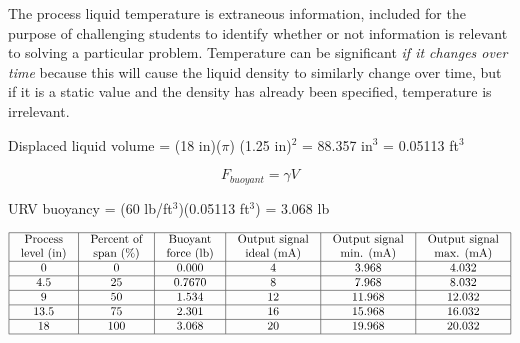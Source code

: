 
The process liquid temperature is extraneous information, included for the purpose of challenging students to identify whether or not information is relevant to solving a particular problem.  Temperature can be significant {\it if it changes over time} because this will cause the liquid density to similarly change over time, but if it is a static value and the density has already been specified, temperature is irrelevant.

\vskip 10pt

Displaced liquid volume = (18 in)($\pi$) (1.25 in)$^{2}$ = 88.357 in$^{3}$ = 0.05113 ft$^{3}$

$$F_{buoyant} = \gamma V$$

URV buoyancy = (60 lb/ft$^{3}$)(0.05113 ft$^{3}$) = 3.068 lb

\vskip 10pt


$$\vbox{\offinterlineskip
\halign{\strut
\vrule \quad\hfil # \ \hfil & 
\vrule \quad\hfil # \ \hfil & 
\vrule \quad\hfil # \ \hfil & 
\vrule \quad\hfil # \ \hfil & 
\vrule \quad\hfil # \ \hfil & 
\vrule \quad\hfil # \ \hfil \vrule \cr
\noalign{\hrule}
%
Process & Percent of & Buoyant & Output signal & Output signal & Output signal \cr
%
level (in) & span (\%) & force (lb) & ideal (mA) & min. (mA) & max. (mA) \cr
%
\noalign{\hrule}
%
0 & 0 & 0.000 & 4 & 3.968 & 4.032 \cr
%
\noalign{\hrule}
%
4.5 & 25 & 0.7670 & 8 & 7.968 & 8.032 \cr
%
\noalign{\hrule}
%
9 & 50 & 1.534 & 12 & 11.968 & 12.032 \cr
%
\noalign{\hrule}
%
13.5 & 75 & 2.301 & 16 & 15.968 & 16.032 \cr
%
\noalign{\hrule}
%
18 & 100 & 3.068 & 20 & 19.968 & 20.032 \cr
%
\noalign{\hrule}
} %
}$$ %




